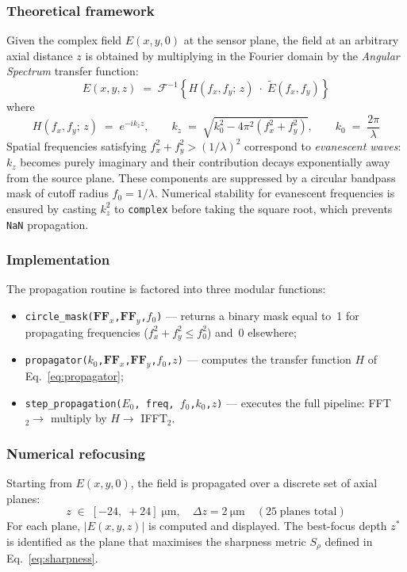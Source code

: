 \subsubsection*{Theoretical framework}
Given the complex field $E(x,y,0)$ at the sensor plane, the field at an
arbitrary axial distance $z$ is obtained by multiplying in the Fourier domain
by the \textit{Angular Spectrum} transfer function:
\begin{equation}
    E(x,y,z)
    \;=\;
    \mathcal{F}^{-1}\!\left\{
        H(f_x,f_y;\,z)\;\cdot\;\tilde{E}(f_x,f_y)
    \right\}
    \label{eq:asm}
\end{equation}
where
\begin{equation}
    H(f_x,f_y;\,z) \;=\; e^{-i k_z z},
    \qquad
    k_z \;=\; \sqrt{k_0^2 - 4\pi^2(f_x^2+f_y^2)},
    \qquad
    k_0 \;=\; \frac{2\pi}{\lambda}
    \label{eq:propagator}
\end{equation}
Spatial frequencies satisfying $f_x^2+f_y^2 > (1/\lambda)^2$ correspond to
\textit{evanescent waves}: $k_z$ becomes purely imaginary and their
contribution decays exponentially away from the source plane.
These components are suppressed by a circular bandpass mask of cutoff radius
$f_0 = 1/\lambda$.
Numerical stability for evanescent frequencies is ensured by casting
$k_z^2$ to \texttt{complex} before taking the square root, which prevents
\texttt{NaN} propagation.

\subsubsection*{Implementation}
The propagation routine is factored into three modular functions:

\begin{itemize}
    \item \texttt{circle\_mask($\mathbf{FF}_x$,$\mathbf{FF}_y$,$f_0$)} —
          returns a binary mask equal to~1 for propagating frequencies
          ($f_x^2+f_y^2 \leq f_0^2$) and~0 elsewhere;
    \item \texttt{propagator($k_0$,$\mathbf{FF}_x$,$\mathbf{FF}_y$,$f_0$,$z$)} —
          computes the transfer function $H$ of Eq.~\eqref{eq:propagator};
    \item \texttt{step\_propagation($E_0$,\,freq,\,$f_0$,$k_0$,$z$)} —
          executes the full pipeline:
          FFT$_2 \to$ multiply by $H \to$ IFFT$_2$.
\end{itemize}

\subsubsection*{Numerical refocusing}
Starting from $E(x,y,0)$, the field is propagated over a discrete set of
axial planes:
\begin{equation}
    z \;\in\; [-24,\;+24]\;\si{\micro\meter},
    \quad \Delta z = \SI{2}{\micro\meter}
    \quad (25\;\text{planes total})
\end{equation}
For each plane, $|E(x,y,z)|$ is computed and displayed.
The best-focus depth $z^*$ is identified as the plane that maximises
the sharpness metric $S_\rho$ defined in Eq.~\eqref{eq:sharpness}.

